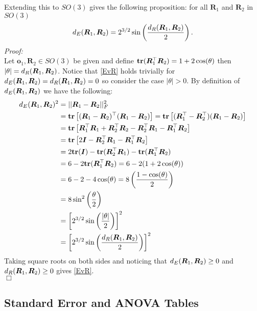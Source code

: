 Extending this to $SO(3)$ gives the following proposition: for all $\bm{R}_1$ and $\bm{R}_2$ in $SO(3)$
\begin{equation}\label{EvR}
{d_E} (\bm{R}_1,\bm{R}_2)=2^{3/2}\sin\left(\frac{{d_R}(\bm{R}_1,\bm{R}_2)}{2}\right).
\end{equation}
\emph{Proof:}\\
Let $\bm{o}_1,\bm{R}_2\in SO(3)$ be given and define ${\mathbf{tr}}(\bm R_1^\top\bm R_2)=1+2\cos(\theta)$ then $|\theta|={d_R}(\bm R_1,\bm R_2)$.  Notice that \eqref{EvR} holds trivially for ${d_E} (\bm R_1,\bm R_2)={d_R}(\bm R_1,\bm R_2)=0$ so consider the case $|\theta|>0$.  By definition of ${d_E} (\bm R_1,\bm R_2)$ we have the following:
\begin{align*}
{d_E} (\bm R_1,\bm R_2)^2
&=||\bm R_1-\bm R_2||_F^2\\
&={\mathbf{tr}}\left[(\bm R_1-\bm R_2)^\top(\bm R_1-\bm R_2)\right]={\mathbf{tr}}\left[(\bm R_1^\top-\bm R_2^\top)(\bm R_1-\bm R_2)\right]\\
&={\mathbf{tr}}\left[\bm R_1^\top\bm R_1+\bm R_2^\top\bm R_2-\bm R_2^\top\bm R_1-\bm R_1^\top\bm R_2\right]\\
&={\mathbf{tr}}\left[2\bm{I}-\bm R_2^\top\bm R_1-\bm R_1^\top\bm R_2\right]\\
&=2{\mathbf{tr}}(\bm{I})-{\mathbf{tr}}(\bm R_2^\top\bm R_1)-{\mathbf{tr}}(\bm R_1^\top\bm R_2)\\
&=6-2{\mathbf{tr}}(\bm R_1^\top\bm R_2)=6-2(1+2\cos(\theta))\\
&=6-2-4\cos(\theta)=8\left(\frac{1-\cos(\theta)}{2}\right)\\
&=8\sin^2\left(\frac{\theta}{2}\right)\\
&=\left[2^{3/2}\sin\left(\frac{|\theta|}{2}\right)\right]^2\\
&=\left[2^{3/2}\sin\left(\frac{{d_R}(\bm R_1,\bm R_2)}{2}\right)\right]^2
\end{align*}
Taking square roots on both sides and noticing that ${d_E} (\bm R_1,\bm R_2)\geq0$ and ${d_R} (\bm R_1,\bm R_2)\geq0$ gives \eqref{EvR}.\\
$\Box$

\subsection{Standard Error and ANOVA Tables}


